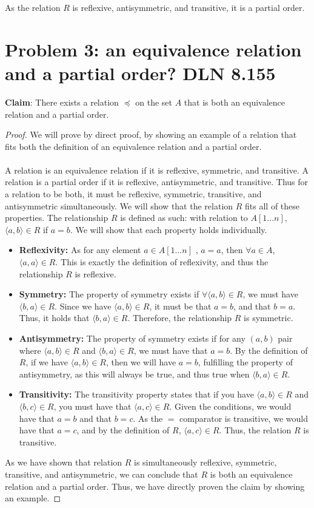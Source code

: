 \documentclass[titlepage]{article}
\begin{document}
As the relation $R$ is reflexive, antisymmetric, and transitive, it is a partial order. 

\section{Problem 3: an equivalence relation and a partial order? DLN 8.155}

\textbf{Claim}: There exists a relation $\preceq$ on the set $A$ that is both an equivalence relation and a partial order.

\begin{proof}
We will prove by direct proof, by showing an example of a relation that fits both the definition of an equivalence relation and a partial order.
\\
\\
A relation is an equivalence relation if it is reflexive, symmetric, and transitive. A relation is a partial order if it is reflexive, antisymmetric, and transitive. Thus for a relation to be both, it must be reflexive, symmetric, transitive, and antisymmetric simultaneously. We will show that the relation $R$ fits all of these properties. The relationship $R$ is defined as such: with relation to $A[1...n]$, $\langle a,b \rangle \in R$ if $a=b$. We will show that each property holds individually.
\begin{itemize}
\item \textbf{Reflexivity:} As for any element $a \in A[1...n]$ , $a=a$, then $\forall a \in A$, $\langle a,a \rangle \in R$. This is exactly the definition of reflexivity, and thus the relationship $R$ is reflexive.
\item \textbf{Symmetry:} The property of symmetry exists if $\forall \langle a,b \rangle \in R$, we must have $\langle b,a \rangle \in R$. Since we have $\langle a,b \rangle \in R$, it must be that $a=b$, and that $b=a$. Thus, it holds that $\langle b,a \rangle \in R$. Therefore, the relationship $R$ is symmetric. 
\item \textbf{Antisymmetry: }The property of symmetry exists if for any $(a,b)$ pair where $\langle a,b \rangle \in R$ and $\langle b,a \rangle \in R$, we must have that $a=b$. By the definition of $R$, if we have $\langle a,b \rangle \in R$, then we will have $a=b$, fulfilling the property of antisymmetry, as this will always be true, and thus true when $\langle b,a \rangle \in R$.
\item \textbf{Transitivity:} The transitivity property states that if you have $\langle a,b \rangle \in R$ and $\langle b,c \rangle \in R$, you must have that $\langle a,c \rangle \in R$. Given the conditions, we would have that $a=b$ and that $b=c$. As the $=$ comparator is transitive, we would have that $a=c$, and by the definition of $R$, $\langle a,c \rangle \in R$. Thus, the relation $R$ is transitive. 
\end{itemize}
As we have shown that relation $R$ is simultaneously reflexive, symmetric, transitive, and antisymmetric, we can conclude that $R$ is both an equivalence relation and a partial order. Thus, we have directly proven the claim by showing an example.
\end{proof} 
\end{document}
